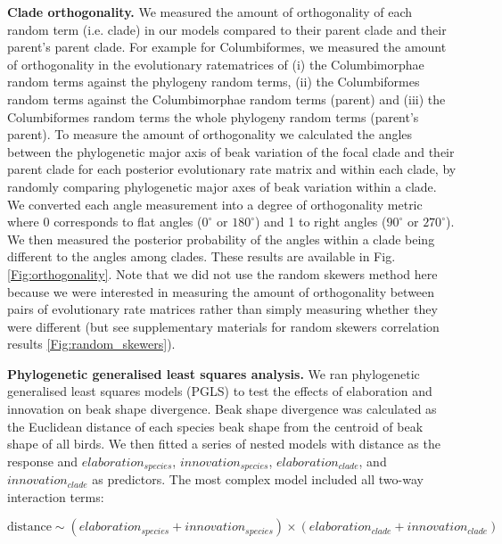 \documentclass[12pt,letterpaper]{article}
\begin{document}
\textbf{Clade orthogonality.} We measured the amount of orthogonality of each random term (i.e.
clade) in our models compared to their parent clade and their parent's parent clade.
For example for Columbiformes, we measured the amount of orthogonality in the evolutionary ratematrices of (i) the Columbimorphae random terms against the phylogeny random terms, (ii) the Columbiformes random terms against the Columbimorphae random terms (parent) and (iii) the Columbiformes random terms the whole phylogeny random terms (parent's parent).
To measure the amount of orthogonality we calculated the angles between the phylogenetic major axis of beak variation of the focal clade and their parent clade for each posterior evolutionary rate matrix and within each clade, by randomly comparing phylogenetic major axes of beak variation within a clade.
We converted each angle measurement into a degree of orthogonality metric where 0 corresponds to flat angles ($0^\circ$ or  $180^\circ$) and 1 to right angles ($90^\circ$ or $270^\circ$).
We then measured the posterior probability of the angles within a clade being different to the angles among clades.
These results are available in Fig. \ref{Fig:orthogonality}.
Note that we did not use the random skewers method here \cite{cheverud2007research} because we were interested in measuring the amount of orthogonality between pairs of evolutionary rate matrices rather than simply measuring whether they were different (but see supplementary materials for random skewers correlation results \ref{Fig:random_skewers}). %

\textbf{Phylogenetic generalised least squares analysis.} %
We ran phylogenetic generalised least squares models (PGLS) to test the effects of elaboration and innovation on beak shape divergence.
Beak shape divergence was calculated as the Euclidean distance of each species beak shape from the centroid of beak shape of all birds.
We then fitted a series of nested models with distance as the response and $elaboration_{species}$, $innovation_{species}$, $elaboration_{clade}$, and $innovation_{clade}$ as predictors.
The most complex model included all two-way interaction terms:

\begin{equation}
\text{distance} \mathtt{\sim} (elaboration_{species} + innovation_{species}) \times (elaboration_{clade} + innovation_{clade})
\end{equation}
\end{document}
